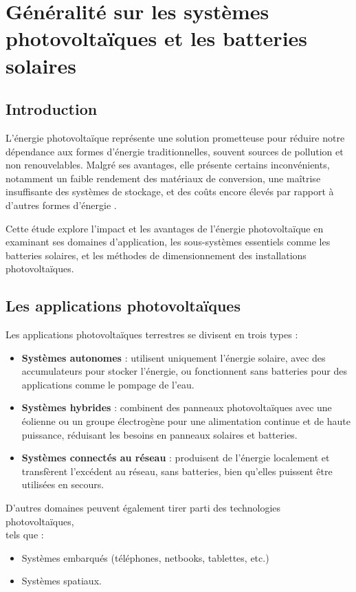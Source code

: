 \chapter{Généralité sur les systèmes photovoltaïques et les batteries solaires}
\section{Introduction}
L’énergie photovoltaïque représente une solution prometteuse pour réduire notre dépendance aux formes d’énergie traditionnelles, souvent sources de pollution et non renouvelables. Malgré ses avantages, elle présente certains inconvénients, notamment un faible rendement des matériaux de conversion, une maîtrise insuffisante des systèmes de stockage, et des coûts encore élevés par rapport à d’autres formes d’énergie   .

Cette étude explore l'impact et les avantages de l'énergie photovoltaïque en examinant ses domaines d'application, les sous-systèmes essentiels comme les batteries solaires, et les méthodes de dimensionnement des installations photovoltaïques. 

\section{Les applications photovoltaïques}
Les applications photovoltaïques terrestres se divisent en trois types \cite{t1} :
\begin{itemize}
	\item \textbf{Systèmes autonomes} : utilisent uniquement l’énergie solaire, avec des accumulateurs pour stocker l’énergie, ou fonctionnent sans batteries pour des applications comme le pompage de l’eau.
	\item \textbf{Systèmes hybrides} : combinent des panneaux photovoltaïques avec une éolienne ou un groupe électrogène pour une alimentation continue et de haute puissance, réduisant les besoins en panneaux solaires et batteries.
	\item \textbf{Systèmes connectés au réseau} : produisent de l’énergie localement et transfèrent l'excédent au réseau, sans batteries, bien qu'elles puissent être utilisées en secours.
\end{itemize}


D'autres domaines peuvent également tirer parti des technologies photovoltaïques, \\
tels que :
\begin{itemize}
	\item Systèmes embarqués (téléphones, netbooks, tablettes, etc.)
	\item Systèmes spatiaux.
\end{itemize}


